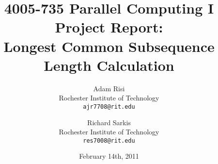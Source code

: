 \documentclass[12pt]{report}
\title{4005-735 Parallel Computing I \\ Project Report: \\  Longest Common Subsequence Length Calculation}
\author{Adam Risi \\ Rochester Institute of Technology \\ \texttt{ajr7708@rit.edu} \and Richard Sarkis \\ Rochester Institute of Technology \\  \texttt{res7008@rit.edu}}
\date{February 14th, 2011}
\begin{document}
\maketitle















\nocite{BenMabrouk:2010p429,Liu:2007p402}
\nocite{JinxianLin:2010p424,Rashid:2007p409}




\end{document}
